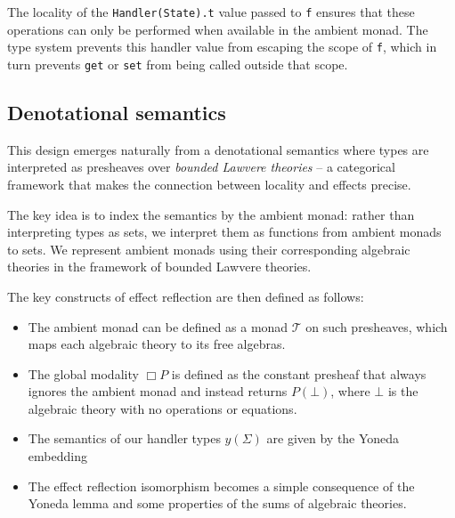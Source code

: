 \documentclass[acmsmall, screen, review, anonymous]{acmart}
\theoremstyle{definition}
\newcommand{\glob}{\mathop{\Box}}
\newcommand{\initial}{\bot}
\newcommand{\yoneda}[1]{y(#1)}
\newcommand{\mon}{\mathcal{T}}
\begin{document}
The locality of the \lstinline[style=oxcaml]{Handler(State).t} value
passed to \lstinline[style=oxcaml]{f} ensures that these operations can
only be performed when available in the ambient monad. The type system
prevents this handler value from escaping the scope of
\lstinline[style=oxcaml]{f}, which in turn prevents
\lstinline[style=oxcaml]{get} or \lstinline[style=oxcaml]{set} from
being called outside that scope.

\subsection{Denotational semantics}

This design emerges naturally from a denotational semantics where types
are interpreted as presheaves over \emph{bounded Lawvere theories} -- a
categorical framework that makes the connection between locality and
effects precise.

The key idea is to index the semantics by the ambient monad: rather than
interpreting types as sets, we interpret them as functions from ambient
monads to sets. We represent ambient monads using their corresponding
algebraic theories in the framework of bounded Lawvere theories.

The key constructs of effect reflection are then defined as follows:
\begin{itemize}
\item The ambient monad can be defined as a monad $\mon$ on such
  presheaves, which maps each algebraic theory to its free algebras.

\item The global modality $\glob P$ is defined as the constant presheaf
  that always ignores the ambient monad and instead returns
  $P(\initial)$, where $\initial$ is the algebraic theory with no
  operations or equations.

\item The semantics of our handler types $\yoneda{\Sigma}$ are given by
  the Yoneda embedding

\item The effect reflection isomorphism becomes a simple consequence of
  the Yoneda lemma and some properties of the sums of algebraic
  theories.
\end{itemize}
\end{document}
